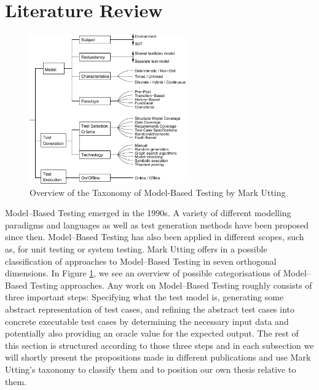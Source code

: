 \section{Literature Review}
\label{sec:RelatedWork}
\begin{figure}
\begin{center}
\includegraphics[width=0.6\textwidth]{./pics/taxonomyOfMBT.pdf}
\end{center}
\caption{Overview of the Taxonomy of Model-Based Testing by Mark Utting \cite{utting2006taxonomy}}
\label{fig:UttingTaxonomy}
\end{figure}
Model--Based Testing emerged in the 1990s. A variety of different modelling paradigms and languages as well as test generation methods have been proposed since then. Model--Based Testing has also been applied in different scopes, such as, for unit testing or system testing. Mark Utting offers in \cite{utting2006taxonomy} a possible classification of approaches to Model--Based Testing in seven orthogonal dimensions. In Figure \ref{fig:UttingTaxonomy}, we see an overview of possible categorisations of Model--Based Testing approaches. Any work on Model--Based Testing roughly consists of three important steps: Specifying what the test model is, generating some abstract representation of test cases, and refining the abstract test cases into concrete executable test cases by determining the necessary input data and potentially also providing an oracle value for the expected output. The rest of this section is structured according to those three steps and in each subsection we will shortly present the propositions made in different publications and use Mark Utting's taxonomy to classify them and to position our own thesis relative to them.
% 
